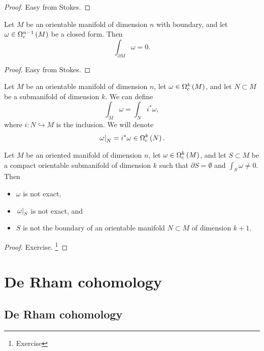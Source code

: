 \begin{proof}
Easy from Stokes.
\end{proof}

\begin{theorem}
Let $ M $ be an orientable manifold of dimension $ n $ with boundary, and let $ \omega \in \Omega_\c^{n - 1}\br{M} $ be a closed form. Then
$$ \int_{\partial M} \omega = 0. $$
\end{theorem}

\begin{proof}
Easy from Stokes.
\end{proof}

\begin{definition}
Let $ M $ be an orientable manifold of dimension $ n $, let $ \omega \in \Omega_\c^k\br{M} $, and let $ N \subset M $ be a submanifold of dimension $ k $. We can define
$$ \int_M \omega = \int_N i^*\omega, $$
where $ i : N \hookrightarrow M $ is the inclusion. We will denote
$$ \eval{\omega}_N = i^*\omega \in \Omega_\c^k\br{N}. $$
\end{definition}

\begin{theorem}
Let $ M $ be an oriented manifold of dimension $ n $, let $ \omega \in \Omega_\c^k\br{M} $, and let $ S \subset M $ be a compact orientable submanifold of dimension $ k $ such that $ \partial S = \emptyset $ and $ \int_S \omega \ne 0 $. Then
\begin{itemize}
\item $ \omega $ is not exact,
\item $ \left. \omega \right|_S $ is not exact, and
\item $ S $ is not the boundary of an orientable manifold $ N \subset M $ of dimension $ k + 1 $.
\end{itemize}
\end{theorem}

\begin{proof}
Exercise. \footnote{Exercise}
\end{proof}

\pagebreak

\section{De Rham cohomology}

\subsection{De Rham cohomology}

